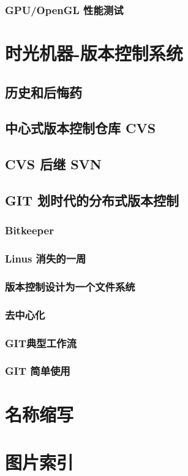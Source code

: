 \documentclass[amstex,twoside]{ctexbook}
\begin{document}
\subsection{  GPU/OpenGL 性能测试}


\chapter{时光机器-版本控制系统}\label{chap:VCS}
\section{   历史和后悔药	}
\section{   中心式版本控制仓库 CVS	}
\section{   CVS 后继 SVN	}
\section{GIT 划时代的分布式版本控制\label{sec:git}}
\subsection{  Bitkeeper	}
\subsection{  Linus 消失的一周	}
\subsection{  版本控制设计为一个文件系统	}
\subsection{ 去中心化	}
\subsection{  GIT典型工作流	}
\subsection{  GIT 简单使用	}


\appendix

{  }


{  }

\chapter{名称缩写}

\chapter{图片索引}
{
\renewcommand{\cleardoublepage}{}

\renewcommand\listfigurename{}
\vskip -3cm
\listoffigures 
}


\end{document}
